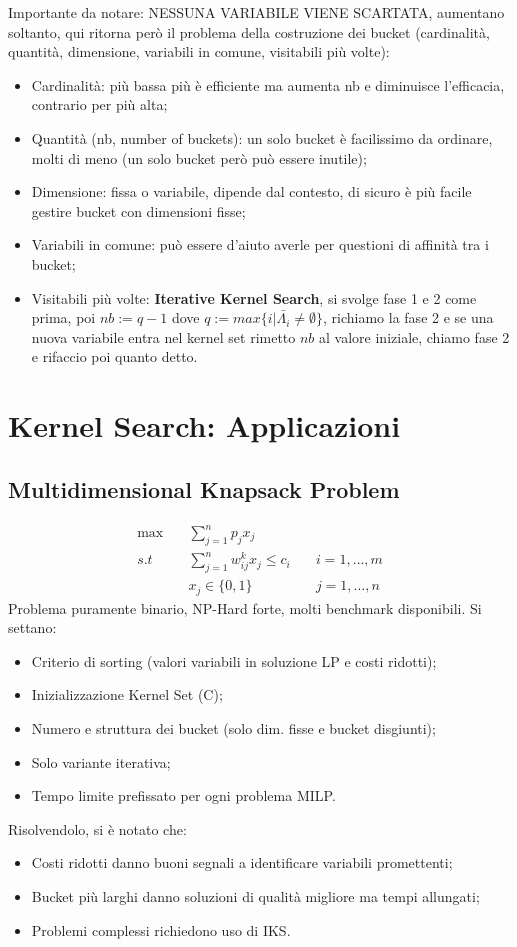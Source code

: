 \begin{enumerate}
	Importante da notare: NESSUNA VARIABILE VIENE SCARTATA, aumentano soltanto, qui ritorna però il problema della costruzione dei bucket (cardinalità, quantità, dimensione, variabili in comune, visitabili più volte):
	\begin{itemize}
		\item Cardinalità: più bassa più è efficiente ma aumenta nb e diminuisce l'efficacia, contrario per più alta;
		\item Quantità (nb, number of buckets): un solo bucket è facilissimo da ordinare, molti di meno (un solo bucket però può essere inutile);
		\item Dimensione: fissa o variabile, dipende dal contesto, di sicuro è più facile gestire bucket con dimensioni fisse;
		\item Variabili in comune: può essere d'aiuto averle per questioni di affinità tra i bucket;
		\item Visitabili più volte: \textbf{Iterative Kernel Search}, si svolge fase 1 e 2 come prima, poi $nb:=q-1$ dove $q:=max\{i|\bar{\Lambda_i} \neq \emptyset \}$, richiamo la fase 2 e se una nuova variabile entra nel kernel set rimetto $nb$ al valore iniziale, chiamo fase 2 e rifaccio poi quanto detto.
	\end{itemize}
\end{enumerate}
\newpage
\section{Kernel Search: Applicazioni}
\subsection{Multidimensional Knapsack Problem}
\begin{equation}
	\begin{aligned}
		\max \quad & \sum_{j=1}^np_jx_j & \\
		s.t \quad & \sum_{j=1}^nw_{ij}^kx_j\le c_i \quad & i=1,\dots, m\\
		& x_j\in \{0,1\} \quad & j=1,\dots , n
	\end{aligned}
\end{equation}
Problema puramente binario, NP-Hard forte, molti benchmark disponibili. Si settano:
\begin{itemize}
	\item Criterio di sorting (valori variabili in soluzione LP e costi ridotti);
	\item Inizializzazione Kernel Set (C);
	\item Numero e struttura dei bucket (solo dim. fisse e bucket disgiunti);
	\item Solo variante iterativa;
	\item Tempo limite prefissato per ogni problema MILP.
\end{itemize}
Risolvendolo, si è notato che:
\begin{itemize}
	\item Costi ridotti danno buoni segnali a identificare variabili promettenti;
	\item Bucket più larghi danno soluzioni di qualità migliore ma tempi allungati;
	\item Problemi complessi richiedono uso di IKS.
\end{itemize}
\newpage
